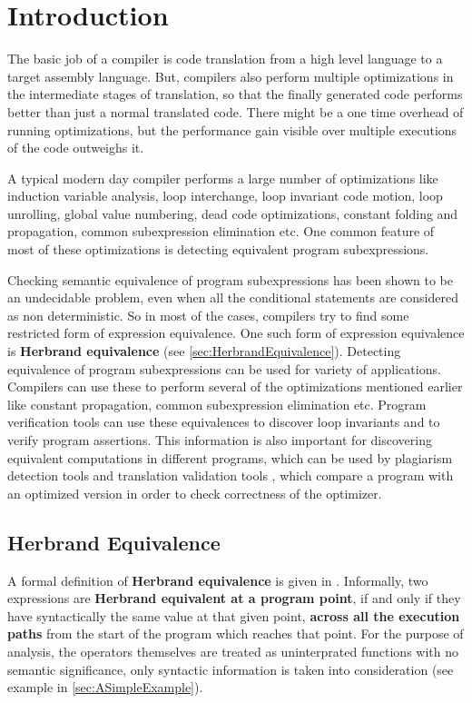 \chapter{Introduction}
\label{chap:chapter1}
\hspace{3mm}

The basic job of a compiler is code translation from a high level 
language to a target assembly language. But, compilers also perform
multiple optimizations in the intermediate stages of translation, 
so that the finally generated code performs better than just a normal 
translated code. There might be a one time overhead of 
running optimizations, but the performance gain visible over multiple 
executions of the code outweighs it.

A typical modern day compiler performs a large number of optimizations 
like induction variable analysis, loop interchange, loop invariant code
motion, loop unrolling, global value numbering, dead code 
optimizations, constant folding and propagation, common subexpression 
elimination etc. One common feature of most of these optimizations is 
detecting equivalent program subexpressions. 

Checking semantic equivalence of program subexpressions has been shown 
to be an undecidable problem, even when all the conditional statements 
are considered as non deterministic. So in most of the cases, compilers 
try to find some restricted form of expression equivalence. One such
form of expression equivalence is \textbf{Herbrand equivalence} (see 
\autoref{sec:HerbrandEquivalence}).
Detecting equivalence of program subexpressions can be used for 
variety of applications. Compilers can use these to perform several 
of the optimizations mentioned earlier like constant propagation, 
common subexpression elimination etc. Program verification tools can 
use these equivalences to discover loop invariants and to verify 
program assertions. This information is also important for discovering
equivalent computations in different programs, which can be used by
plagiarism detection tools and translation validation tools \cite
{Necula, Pnueli}, which compare a program with an optimized version
in order to check correctness of the optimizer.


\section{Herbrand Equivalence}
\label{sec:HerbrandEquivalence}
A formal definition of \textbf{Herbrand equivalence} is given in 
\cite{Ruthing}.
Informally, two expressions are \textbf{Herbrand equivalent at a program 
point}, if and only if they have syntactically the same value at that 
given point, \textbf{across all the execution paths} from the start 
of the program which reaches that point. For the purpose of analysis, 
the operators themselves are treated as uninterprated functions with 
no semantic significance, only syntactic information is taken into 
consideration (see example in \autoref{sec:ASimpleExample}).

